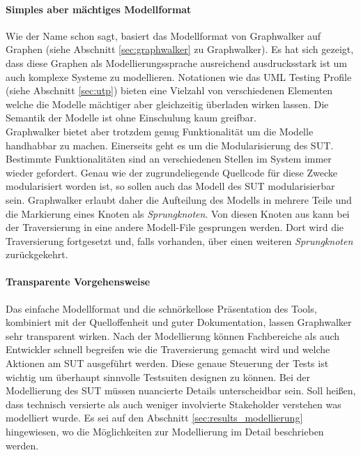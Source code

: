 \paragraph{Simples aber mächtiges Modellformat} Wie der Name schon sagt, basiert das Modellformat von Graphwalker auf Graphen (siehe Abschnitt \ref{sec:graphwalker} zu Graphwalker). Es hat sich gezeigt, dass diese Graphen als Modellierungssprache ausreichend ausdrucksstark ist um auch komplexe Systeme zu modellieren. Notationen wie das UML Testing Profile (siehe Abschnitt \ref{sec:utp}) bieten eine Vielzahl von verschiedenen Elementen welche die Modelle mächtiger aber gleichzeitig überladen wirken lassen. Die Semantik der Modelle ist ohne Einschulung kaum greifbar.\\
Graphwalker bietet aber trotzdem genug Funktionalität um die Modelle handhabbar zu machen. Einerseits geht es um die Modularisierung des SUT. Bestimmte Funktionalitäten sind an verschiedenen Stellen im System immer wieder gefordert. Genau wie der zugrundeliegende Quellcode für diese Zwecke modularisiert worden ist, so sollen auch das Modell des SUT modularisierbar sein. Graphwalker erlaubt daher die Aufteilung des Modells in mehrere Teile und die Markierung eines Knoten als \textit{Sprungknoten}. Von diesen Knoten aus kann bei der Traversierung in eine andere Modell-File gesprungen werden. Dort wird die Traversierung fortgesetzt und, falls vorhanden, über einen weiteren \textit{Sprungknoten} zurückgekehrt.

\paragraph{Transparente Vorgehensweise} Das einfache Modellformat und die schnörkellose Präsentation des Tools, kombiniert mit der Quelloffenheit und guter Dokumentation, lassen Graphwalker sehr transparent wirken. Nach der Modellierung können Fachbereiche als auch Entwickler schnell begreifen wie die Traversierung gemacht wird und welche Aktionen am SUT ausgeführt werden. Diese genaue Steuerung der Tests ist wichtig um überhaupt sinnvolle Testsuiten designen zu können. Bei der Modellierung des SUT müssen nuancierte Details unterscheidbar sein. Soll heißen, dass technisch versierte als auch weniger involvierte Stakeholder verstehen was modelliert wurde. Es sei auf den Abschnitt \ref{sec:results_modellierung} hingewiesen, wo die Möglichkeiten zur Modellierung im Detail beschrieben werden.




